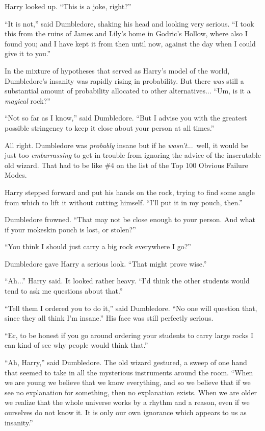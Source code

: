 Harry looked up. “This is a joke, right?”

“It is not,” said Dumbledore, shaking his head and looking very serious. “I took this from the ruins of James and Lily’s home in Godric’s Hollow, where also I found you; and I have kept it from then until now, against the day when I could give it to you.”

In the mixture of hypotheses that served as Harry’s model of the world, Dumbledore’s insanity was rapidly rising in probability. But there \emph{was} still a substantial amount of probability allocated to other alternatives... “Um, is it a \emph{magical} rock?”

“Not so far as I know,” said Dumbledore. “But I advise you with the greatest possible stringency to keep it close about your person at all times.”

All right. Dumbledore was \emph{probably} insane but if he \emph{wasn’t}...\ well, it would be just too \emph{embarrassing} to get in trouble from ignoring the advice of the inscrutable old wizard. That had to be like \#4 on the list of the Top 100 Obvious Failure Modes.

Harry stepped forward and put his hands on the rock, trying to find some angle from which to lift it without cutting himself. “I’ll put it in my pouch, then.”

Dumbledore frowned. “That may not be close enough to your person. And what if your mokeskin pouch is lost, or stolen?”

“You think I should just carry a big rock everywhere I go?”

Dumbledore gave Harry a serious look. “That might prove wise.”

“Ah...” Harry said. It looked rather heavy. “I’d think the other students would tend to ask me questions about that.”

“Tell them I ordered you to do it,” said Dumbledore. “No one will question that, since they all think I’m insane.” His face was still perfectly serious.

“Er, to be honest if you go around ordering your students to carry large rocks I can kind of see why people would think that.”

“Ah, Harry,” said Dumbledore. The old wizard gestured, a sweep of one hand that seemed to take in all the mysterious instruments around the room. “When we are young we believe that we know everything, and so we believe that if we see no explanation for something, then no explanation exists. When we are older we realize that the whole universe works by a rhythm and a reason, even if we ourselves do not know it. It is only our own ignorance which appears to us as insanity.”

